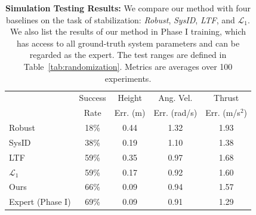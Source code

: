 \begin{table}[h]
\caption{\label{tab:sim-metrics} \textbf{Simulation Testing Results:} We compare our method with four baselines on the task of stabilization: \emph{Robust}, \emph{SysID}, \emph{LTF}, and $\mathcal{L}_1$. We also list the results of our method in Phase I training, which has access to all ground-truth system parameters and can be regarded as the expert. The test ranges are defined in Table~\ref{tab:randomization}.
Metrics are averages over 100 experiments.
}
\centering
\begin{tabular*}{0.45\textwidth}{@{}lcccc@{}}
\toprule
   & Success & Height  & Ang. Vel. &  Thrust \\ &Rate& Err. (m) &Err. (rad/s)  & Err. (m/s$^2$) \\%
\midrule
 Robust~\cite{peng2018sim,tobin2017domain} & 18\%& 0.44 & 1.32 & 1.93 \\ 
 SysID~\cite{SysID} & 38\%& 0.19 & 1.10 & 1.38\\
 LTF~\cite{LTF} & 59\% & 0.35 & 0.97 & 1.68 \\
 $\mathcal{L}_1$~\cite{hanover2021performance} & 59\% & 0.17 & 0.92 & 1.60 \\
 Ours & 66\% & 0.09 & 0.94 & 1.57 \\
 \midrule
 Expert (Phase I) & 69\% & 0.09 & 0.91 & 1.29 \\
\bottomrule
\end{tabular*}

\end{table}
